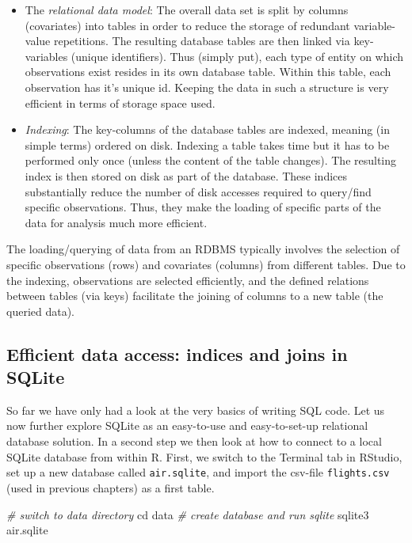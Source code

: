 \documentclass[
  12pt,
]{style/krantz}
\newenvironment{Shaded}{\begin{snugshade}}{\end{snugshade}}
\newcommand{\BuiltInTok}[1]{#1}
\newcommand{\CommentTok}[1]{\textcolor[rgb]{0.56,0.35,0.01}{\textit{#1}}}
\newcommand{\ExtensionTok}[1]{#1}
\newcommand{\NormalTok}[1]{#1}
\begin{document}
\begin{itemize}
\item
  The \emph{relational data model}: The overall data set is split by columns (covariates) into tables in order to reduce the storage of redundant variable-value repetitions. The resulting database tables are then linked via key-variables (unique identifiers). Thus (simply put), each type of entity on which observations exist resides in its own database table. Within this table, each observation has it's unique id. Keeping the data in such a structure is very efficient in terms of storage space used.
\item
  \emph{Indexing}: The key-columns of the database tables are indexed, meaning (in simple terms) ordered on disk. Indexing a table takes time but it has to be performed only once (unless the content of the table changes). The resulting index is then stored on disk as part of the database. These indices substantially reduce the number of disk accesses required to query/find specific observations. Thus, they make the loading of specific parts of the data for analysis much more efficient.
\end{itemize}

The loading/querying of data from an RDBMS typically involves the selection of specific observations (rows) and covariates (columns) from different tables. Due to the indexing, observations are selected efficiently, and the defined relations between tables (via keys) facilitate the joining of columns to a new table (the queried data).

\hypertarget{efficient-data-access-indices-and-joins-in-sqlite}{%
\subsection{Efficient data access: indices and joins in SQLite}\label{efficient-data-access-indices-and-joins-in-sqlite}}

So far we have only had a look at the very basics of writing SQL code. Let us now further explore SQLite as an easy-to-use and easy-to-set-up relational database solution. In a second step we then look at how to connect to a local SQLite database from within R. First, we switch to the Terminal tab in RStudio, set up a new database called \texttt{air.sqlite}, and import the csv-file \texttt{flights.csv} (used in previous chapters) as a first table.

\begin{Shaded}
\begin{Highlighting}[]
\CommentTok{\# switch to data directory}
\BuiltInTok{cd}\NormalTok{ data}
\CommentTok{\# create database and run sqlite}
\ExtensionTok{sqlite3}\NormalTok{ air.sqlite}
\end{Highlighting}
\end{Shaded}
\end{document}
